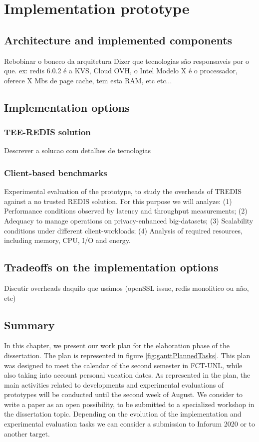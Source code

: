 \chapter{Implementation prototype}
\label{cha:workplan}

\section{Architecture and implemented components}
Rebobinar o boneco da arquitetura
Dizer que tecnologias são responsaveis por o que. ex: redis 6.0.2 é a KVS, Cloud OVH, o Intel Modelo X é o processador, oferece X Mbs de page cache, tem esta RAM, etc etc...

\section{Implementation options}
\subsection{TEE-REDIS solution}
Descrever a solucao com detalhes de tecnologias
\subsection{Client-based benchmarks}


Experimental evaluation of the prototype, to study the overheads of TREDIS against a no trusted REDIS solution. For this purpose we will analyze: (1) Performance conditions observed by latency and throughput measurements; (2) Adequacy to manage operations on privacy-enhanced big-datasets; (3) Scalability conditions under different client-workloads; (4) Analysis of required resources, including memory, CPU, I/O and energy.
\section{Tradeoffs on the implementation options}
Discutir overheads daquilo que usámos (openSSL issue, redis monolitico ou não, etc)
\section{Summary}


In this chapter, we present our work plan for the elaboration phase of the dissertation. The plan is represented in figure \ref{fig:ganttPlannedTasks}. This plan was designed to meet the calendar of the second semester in FCT-UNL, while also taking into account personal vacation dates. As represented in the plan, the main activities related to developments and experimental evaluations of prototypes will be conducted until the second week of August. 
We consider to write a paper as an open possibility, to be submitted to a specialized workshop in the dissertation topic. Depending on the evolution of the implementation and experimental evaluation tasks we can consider a submission to Inforum 2020 or to another target.


